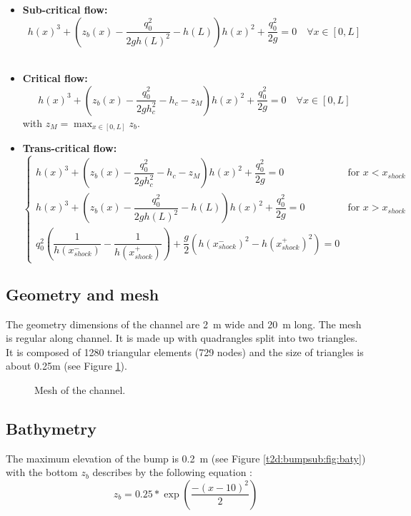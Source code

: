 \begin{itemize}
\item {\bf Sub-critical flow:} 
\begin{equation}
 h(x)^3 + \left( z_b(x) - \dfrac{q_0^2}{2g h(L)^2} - h(L) \right) h(x)^2 + \dfrac{q_0^2}{2g} = 0 \quad \forall x \in [0,L]
\end{equation}
\

\item {\bf Critical flow:}
\begin{equation}
h(x)^3 + \left( z_b(x) - \dfrac{q_0^2}{2g h_c^2} - h_c - z_M \right) h(x)^2 + \dfrac{q_0^2}{2g} = 0 \quad \forall x \in [0,L]  
\end{equation}
with $ z_M = \max_{x \in [0,L]}z_b$.
\

\item {\bf Trans-critical flow:}
\begin{equation}
\begin{cases}
h(x)^3 + \left( z_b(x) - \dfrac{q_0^2}{2g h_c^2} - h_c - z_M \right) h(x)^2 + \dfrac{q_0^2}{2g} = 0 \quad & \text{for  } x < x_{shock}  \\
h(x)^3 + \left( z_b(x) - \dfrac{q_0^2}{2g h(L)^2} - h(L) \right) h(x)^2 + \dfrac{q_0^2}{2g} = 0 \quad &\text{for  } x > x_{shock} \\
q_0^2 \left( \dfrac{1}{h(x_{shock}^-)} - \dfrac{1}{h(x_{shock}^+)} \right) + \dfrac{g}{2} \left( h(x_{shock}^-)^2 -h(x_{shock}^+)^2 \right) = 0
\end{cases}
\end{equation}
\end{itemize}

\subsection{Geometry and mesh}

The geometry dimensions of the channel are 2~m wide and 20~m long.
The mesh is regular along channel. It is made up with
quadrangles split into two triangles.
It is composed of 1280 triangular elements (729 nodes)
and the size of triangles is about 0.25m
(see Figure \ref{t2d:bumpsub:fig:mesh}).

\begin{figure}[!htbp]
 \centering
 \caption{Mesh of the channel.}
 \label{t2d:bumpsub:fig:mesh}
\end{figure}

\subsection{Bathymetry}
The maximum elevation of
the bump is 0.2~m (see Figure \ref{t2d:bumpsub:fig:baty}) with
the bottom $z_b$ describes by the following equation :
\begin{equation*}
z_b = 0.25 * \exp \left(\dfrac{-(x-10)^2}{2} \right)
\end{equation*}

